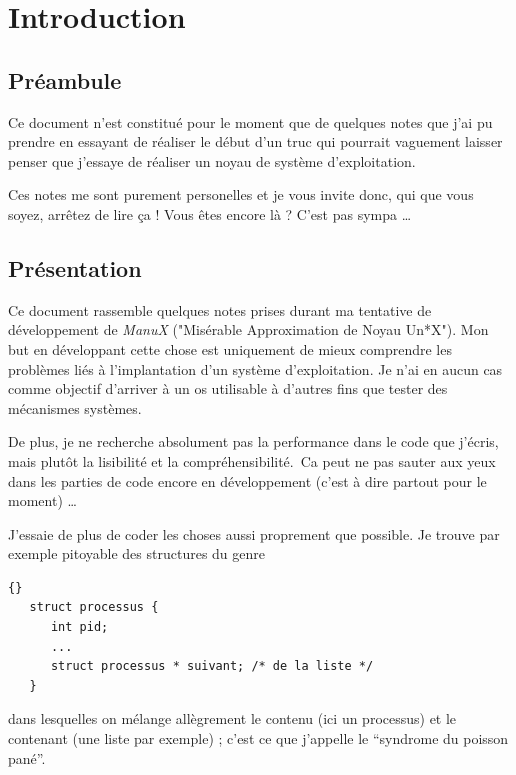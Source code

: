 %
\section{Introduction}

\subsection{Préambule}
   Ce document n'est constitué pour le moment que de quelques notes
que j'ai pu prendre en essayant de réaliser le début d'un truc qui pourrait
vaguement laisser penser que j'essaye de réaliser un noyau de système
d'exploitation. 

   Ces notes me sont purement personelles et je vous invite donc, qui que
vous soyez, arrêtez de lire ça ! Vous êtes encore là ? C'est pas sympa \ldots

\subsection{Présentation}

   Ce document rassemble quelques notes prises durant ma tentative de
dévelop\-pement de {\em ManuX} ("Misérable Approximation de Noyau
Un*X"). Mon but en développant cette chose est uniquement de mieux
comprendre les problèmes liés à l'implantation d'un système
d'exploitation. Je n'ai en aucun cas comme objectif d'arriver à un
{\sc os} utilisable à d'autres fins que tester des mécanismes
systèmes. 

   De plus, je ne recherche absolument pas la performance dans le code 
que j'écris, mais plutôt la lisibilité et la compréhensibilité. \,Ca
peut ne pas sauter aux yeux dans les parties de code encore en
développement (c'est à dire partout pour le moment) \ldots 

   J'essaie de plus de coder les choses aussi proprement que
possible. Je trouve par exemple pitoyable des structures du genre 

\begin{lstlisting}{}
   struct processus {
      int pid;
      ...
      struct processus * suivant; /* de la liste */
   }
\end{lstlisting}

   dans lesquelles on mélange allègrement le contenu (ici un
processus) et le contenant (une liste par exemple) ; c'est ce que
j'appelle le ``syndrome du poisson pané''.

